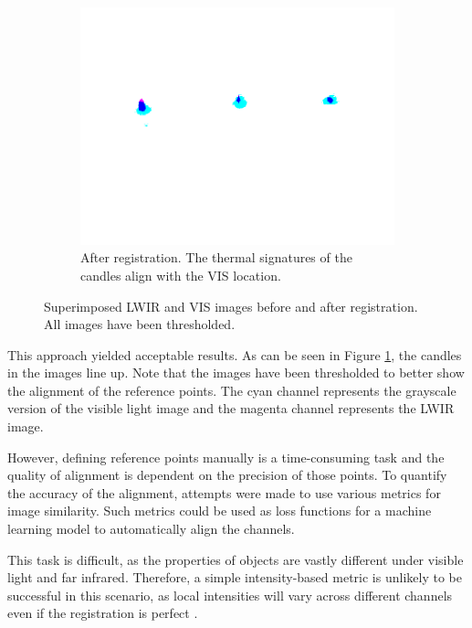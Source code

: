 \documentclass{l4proj}
\begin{document}
\begin{figure}[ht]
  \begin{subfigure}[h!]{0.3\textwidth}
    \includegraphics[width=\textwidth, trim={3.5cm 9cm 3.5cm 4.5cm}, clip, frame]{images/registration/registered_affine.png}
    \caption{After registration. The thermal signatures of the candles align with the VIS location.}
  \end{subfigure}
  \caption{Superimposed LWIR and VIS images before and after registration. All images have been thresholded.}
  \label{fig:linear_trans_before_after}
\end{figure}

This approach yielded acceptable results. As can be seen in Figure \ref{fig:linear_trans_before_after}, the candles in the images line up. Note that the images have been thresholded to better show the alignment of the reference points. The cyan channel represents the grayscale version of the visible light image and the magenta channel represents the LWIR image.

However, defining reference points manually is a time-consuming task and the quality of alignment is dependent on the precision of those points. To quantify the accuracy of the alignment, attempts were made to use various metrics for image similarity. Such metrics could be used as loss functions for a machine learning model to automatically align the channels.

This task is difficult, as the properties of objects are vastly different under visible light and far infrared. Therefore, a simple intensity-based metric is unlikely to be successful in this scenario, as local intensities will vary across different channels even if the registration is perfect \citep{myronenko_intensity-based_2010}.
\end{document}
